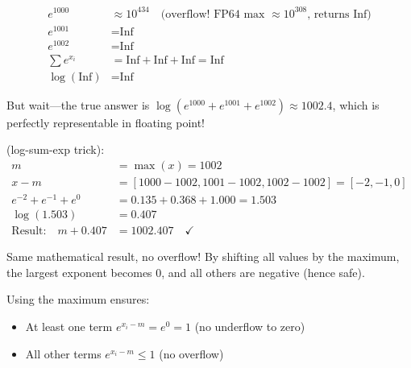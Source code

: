 \vspace{1em}
\begin{align*}
    e^{1000} &\approx 10^{434} \quad \text{(overflow! FP64 max $\approx 10^{308}$, returns Inf)} \\
    e^{1001} &= \text{Inf} \\
    e^{1002} &= \text{Inf} \\
    \sum e^{x_i} &= \text{Inf} + \text{Inf} + \text{Inf} = \text{Inf} \\
    \log(\text{Inf}) &= \text{Inf}
\end{align*}

But wait---the true answer is $\log(e^{1000} + e^{1001} + e^{1002}) \approx 1002.4$, which is perfectly representable in floating point!


\vspace{1em}
 (log-sum-exp trick):
\begin{align*}
    m &= \max(x) = 1002 \\
    x - m &= [1000-1002, 1001-1002, 1002-1002] = [-2, -1, 0] \\
    e^{-2} + e^{-1} + e^{0} &= 0.135 + 0.368 + 1.000 = 1.503 \\
    \log(1.503) &= 0.407 \\
    \text{Result:} \quad m + 0.407 &= 1002.407 \quad \checkmark
\end{align*}

Same mathematical result, no overflow! By shifting all values by the maximum, the largest exponent becomes 0, and all others are negative (hence safe).


\vspace{1em}
 Using the maximum ensures:
\begin{itemize}
    \item At least one term $e^{x_i - m} = e^0 = 1$ (no underflow to zero)
    \item All other terms $e^{x_i - m} \leq 1$ (no overflow)
\end{itemize}


